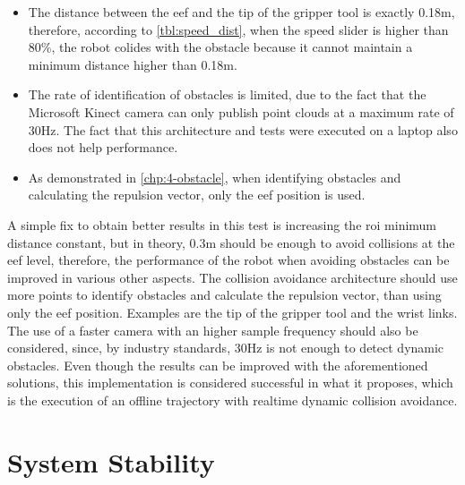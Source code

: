 \begin{itemize}
    \item The distance between the \ac{eef} and the tip of the gripper tool is exactly 0.18m, therefore, according to \autoref{tbl:speed_dist}, when the speed slider is higher than 80\%, the robot colides with the obstacle because it cannot maintain a minimum distance higher than 0.18m.
    \item The rate of identification of obstacles is limited, due to the fact that the Microsoft Kinect camera can only publish point clouds at a maximum rate of 30Hz. The fact that this architecture and tests were executed on a laptop also does not help performance.
    \item As demonstrated in \autoref{chp:4-obstacle}, when identifying obstacles and calculating the repulsion vector, only the \ac{eef} position is used.
\end{itemize}

\par A simple fix to obtain better results in this test is increasing the \ac{roi} minimum distance constant, but in theory, 0.3m should be enough to avoid collisions at the \ac{eef} level, therefore, the performance of the robot when avoiding obstacles can be improved in various other aspects. The collision avoidance architecture should use more points to identify obstacles and calculate the repulsion vector, than using only the \ac{eef} position. Examples are the tip of the gripper tool and the wrist links. The use of a faster camera with an higher sample frequency should also be considered, since, by industry standards, 30Hz is not enough to detect dynamic obstacles. Even though the results can be improved with the aforementioned solutions, this implementation is considered successful in what it proposes, which is the execution of an offline trajectory with realtime dynamic collision avoidance.



\section{System Stability}


